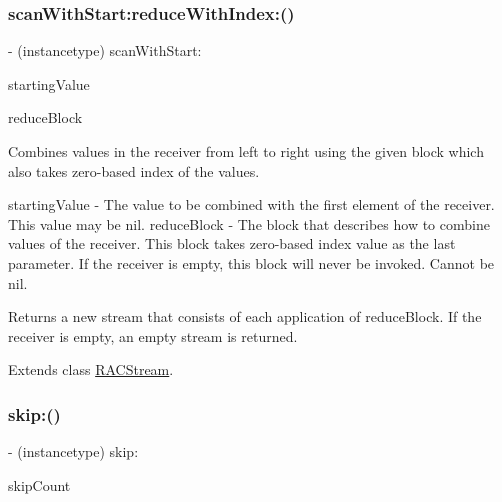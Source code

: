 \subsubsection{\texorpdfstring{scan\+With\+Start\+:reduce\+With\+Index\+:()}{scanWithStart:reduceWithIndex:()}\hspace{0.1cm}{\footnotesize\ttfamily [3/3]}}
{\footnotesize\ttfamily -\/ (instancetype) scan\+With\+Start\+: \begin{DoxyParamCaption}\item[{(id)}]{starting\+Value }\item[{reduceWithIndex:(id($^\wedge$)(id running, id next, N\+S\+U\+Integer index))}]{reduce\+Block }\end{DoxyParamCaption}}

Combines values in the receiver from left to right using the given block which also takes zero-\/based index of the values.

starting\+Value -\/ The value to be combined with the first element of the receiver. This value may be {\ttfamily nil}. reduce\+Block -\/ The block that describes how to combine values of the receiver. This block takes zero-\/based index value as the last parameter. If the receiver is empty, this block will never be invoked. Cannot be nil.

Returns a new stream that consists of each application of {\ttfamily reduce\+Block}. If the receiver is empty, an empty stream is returned. 

Extends class \mbox{\hyperlink{interface_r_a_c_stream_a69cedeb6e96a6d4154f2256fdcbe27b1}{R\+A\+C\+Stream}}.

\mbox{\label{category_r_a_c_stream_07_operations_08_a1525f1607d8ff7f04a0afc1a5193436a}} 
\subsubsection{\texorpdfstring{skip\+:()}{skip:()}\hspace{0.1cm}{\footnotesize\ttfamily [1/3]}}
{\footnotesize\ttfamily -\/ (instancetype) skip\+: \begin{DoxyParamCaption}\item[{(N\+S\+U\+Integer)}]{skip\+Count }\end{DoxyParamCaption}}

